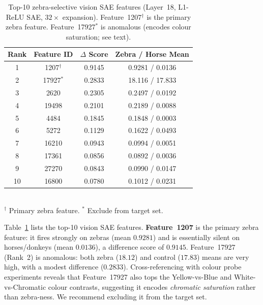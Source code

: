 \documentclass{article}
\begin{document}
\begin{table}[ht]
\caption{Top-10 zebra-selective vision SAE features (Layer~18,
         L1-ReLU SAE, $32\times$ expansion). Feature~1207$^\dagger$ is
         the primary zebra feature. Feature~17927$^*$ is anomalous
         (encodes colour saturation; see text).}
\label{tab:vision_features}
\vskip 0.15in
\begin{center}
\begin{small}
\begin{tabular}{cccc}
\toprule
\textbf{Rank} & \textbf{Feature ID}
  & \textbf{$\Delta$ Score} & \textbf{Zebra / Horse Mean} \\
\midrule
1  & 1207$^\dagger$   & 0.9145 & 0.9281 / 0.0136 \\
2  & 17927$^*$        & 0.2833 & 18.116 / 17.833 \\
3  & 2620             & 0.2305 & 0.2497 / 0.0192 \\
4  & 19498            & 0.2101 & 0.2189 / 0.0088 \\
5  & 4484             & 0.1845 & 0.1848 / 0.0003 \\
6  & 5272             & 0.1129 & 0.1622 / 0.0493 \\
7  & 16210            & 0.0943 & 0.0994 / 0.0051 \\
8  & 17361            & 0.0856 & 0.0892 / 0.0036 \\
9  & 27270            & 0.0843 & 0.0990 / 0.0147 \\
10 & 16800            & 0.0780 & 0.1012 / 0.0231 \\
\bottomrule
\end{tabular}
\\[4pt]
{\footnotesize $^\dagger$ Primary zebra feature.
  $^*$ Exclude from target set.}
\end{small}
\end{center}
\vskip -0.1in
\end{table}

Table~\ref{tab:vision_features} lists the top-10 vision SAE features.
\textbf{Feature~1207} is the primary zebra feature: it fires strongly
on zebras (mean $0.9281$) and is essentially silent on horses/donkeys
(mean $0.0136$), a difference score of $0.9145$. Feature~17927 (Rank~2)
is anomalous: both zebra ($18.12$) and control ($17.83$) means are very
high, with a modest difference ($0.2833$). Cross-referencing with colour
probe experiments reveals that Feature~17927 also tops the Yellow-vs-Blue
and White-vs-Chromatic colour contrasts, suggesting it encodes
\emph{chromatic saturation} rather than zebra-ness. We recommend
excluding it from the target set.
\end{document}
